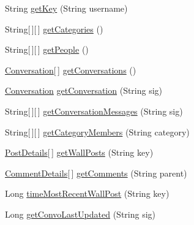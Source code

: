 \begin{DoxyCompactItemize}
\item 
String \hyperlink{classballmerpeak_1_1turtlenet_1_1server_1_1TurtlenetImpl_a780b106db510694aaa9156d47c09ab05}{get\-Key} (String username)
\item 
String\mbox{[}$\,$\mbox{]}\mbox{[}$\,$\mbox{]} \hyperlink{classballmerpeak_1_1turtlenet_1_1server_1_1TurtlenetImpl_aa1c659a0e4d6d60761b3f324cbe7bd8c}{get\-Categories} ()
\item 
String\mbox{[}$\,$\mbox{]}\mbox{[}$\,$\mbox{]} \hyperlink{classballmerpeak_1_1turtlenet_1_1server_1_1TurtlenetImpl_a5c033785fd6e598229c23c5c08b805ba}{get\-People} ()
\item 
\hyperlink{classballmerpeak_1_1turtlenet_1_1shared_1_1Conversation}{Conversation}\mbox{[}$\,$\mbox{]} \hyperlink{classballmerpeak_1_1turtlenet_1_1server_1_1TurtlenetImpl_a3b7c5b806f0a79198d3042964bf614c1}{get\-Conversations} ()
\item 
\hyperlink{classballmerpeak_1_1turtlenet_1_1shared_1_1Conversation}{Conversation} \hyperlink{classballmerpeak_1_1turtlenet_1_1server_1_1TurtlenetImpl_a70dcea522454279983e72b0fd5c3e9a6}{get\-Conversation} (String sig)
\item 
String\mbox{[}$\,$\mbox{]}\mbox{[}$\,$\mbox{]} \hyperlink{classballmerpeak_1_1turtlenet_1_1server_1_1TurtlenetImpl_ac92b6c500d8f9f2b0457e99005bf7674}{get\-Conversation\-Messages} (String sig)
\item 
String\mbox{[}$\,$\mbox{]}\mbox{[}$\,$\mbox{]} \hyperlink{classballmerpeak_1_1turtlenet_1_1server_1_1TurtlenetImpl_a4ec6b30f0a39631b060273ce493e3a22}{get\-Category\-Members} (String category)
\item 
\hyperlink{classballmerpeak_1_1turtlenet_1_1shared_1_1PostDetails}{Post\-Details}\mbox{[}$\,$\mbox{]} \hyperlink{classballmerpeak_1_1turtlenet_1_1server_1_1TurtlenetImpl_a25cd6a95e1664bd10cac1ecad0c985df}{get\-Wall\-Posts} (String key)
\item 
\hyperlink{classballmerpeak_1_1turtlenet_1_1shared_1_1CommentDetails}{Comment\-Details}\mbox{[}$\,$\mbox{]} \hyperlink{classballmerpeak_1_1turtlenet_1_1server_1_1TurtlenetImpl_a8ce303e4ed5dd6b459c28595c4fe53a4}{get\-Comments} (String parent)
\item 
Long \hyperlink{classballmerpeak_1_1turtlenet_1_1server_1_1TurtlenetImpl_a0555da815949426da19e4aa94798fb77}{time\-Most\-Recent\-Wall\-Post} (String key)
\item 
Long \hyperlink{classballmerpeak_1_1turtlenet_1_1server_1_1TurtlenetImpl_a9215bd0cbe7b6c5e925867c7a8ab4be3}{get\-Convo\-Last\-Updated} (String sig)
\item 

\end{DoxyCompactItemize}
